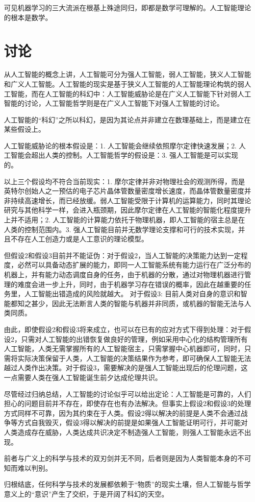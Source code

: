\documentclass[fontset=fandol,UTF8]{article}
\begin{document}
可见机器学习的三大流派在根基上殊途同归，即都是数学可理解的。人工智能理论的根本是数学。

\section{讨论}
从人工智能的概念上讲，人工智能可分为强人工智能，弱人工智能，狭义人工智能和广义人工智能。人工智能的现实是基于狭义人工智能的人工智能理论构筑的弱人工智能，而在人工智能的科幻中：人工智能威胁论是在广义人工智能下针对弱人工智能的讨论，人工智能哲学则是在广义人工智能下对强人工智能的讨论。

人工智能的“科幻”之所以科幻，是因为其论点并非建立在数理基础上，而是建立在某些假设上。

人工智能威胁论的根本假设是：1. 人工智能会继续依照摩尔定律快速发展；2. 人工智能会超出人类的控制。人工智能哲学的假设是：3. 强人工智能是可以实现的。

以上三个假设均不符合当前现实：1. 摩尔定律并非对物理社会的观测所得，而是英特尔创始人之一预估的电子芯片晶体管数量密度增长速度，而晶体管数量密度并非持续高速增长，而已经放缓。弱人工智能受限于计算机的运算能力，同时其理论研究与其他科学一样，会进入瓶颈期，因此摩尔定律在人工智能的智能化程度提升上并不适用；2. 人工智能的计算能力依托于物理机器，即人工智能的宿主总是在人类的控制范围内。3. 强人工智能目前并无数学理论支撑和可行的技术实现，并且不存在人工创造力或是人工意识的理论模型。

但假设2和假设3目前并不能证伪：对于假设2，当人工智能的决策能力达到一定程度，必然可以具备动态扩展的能力，即同一人工智能系统有能力运行在广泛分布的机器上，并有能力动态调度自身的任务，由于机器的分散，通过对物理机器进行管理的难度会进一步上升，同时，由于机器学习存在错误的概率，因此在越重要的任务里，人工智能出错造成的风险就越大。 对于假设3: 目前人类对自身的意识和智能都知之甚少，因此无法断言人类的智能与机器并非同质，或机器的智能无法与人类同质。

由此，即使假设2和假设3将来成立，也可以在已有的应对方式下得到处理：对于假设2，只需对人工智能的出错恢复做良好的管理，例如采用中心化的结构管理所有人工智能，人类无需掌握所有的人工智能宿主，只需掌握中心机器即可，同时，只需将实际决策保留于人类，人工智能的决策结果作为参考，即可确保人工智能无法越过人类作出决策。对于假设3，需要解决的是强人工智能出现后的伦理问题，这一点需要人类在强人工智能诞生前夕达成伦理共识。

尽管经过归纳总结，人工智能的讨论似乎可以给出定论：人工智能是可靠的，人们担心的问题目前并不存在，即使存在也有办法解决。但事实上假设2和假设3的处理方式同样不可靠，因为其约束在于人类。假设2得以解决的前提是人类不会通过战争等方式自我毁灭，假设3得以解决的前提是如果强人工智能证明可行，并可能对人类造成存在威胁，人类达成共识决定不制造强人工智能，则强人工智能永远不出现。

前者与广义上的科学与技术的双刃剑并无不同，后者则是因为人类智能本身的不可知而难以判别。

归根结底，任何科学与技术的发展都依赖于“物质”的现实土壤，但人工智能与哲学意义上的“意识”产生了交织，于是开阔了科幻的天空。


\end{document}
